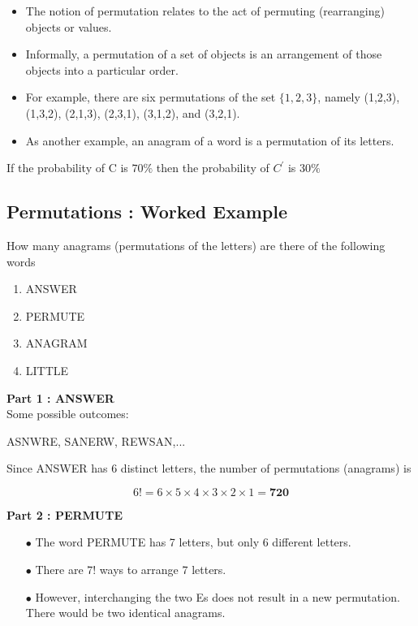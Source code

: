 \documentclass[]{report}
\begin{document}
	\begin{itemize}
		\item The notion of permutation relates to the act of permuting (rearranging) objects or values. 
		\item Informally, a permutation of a set of objects is an arrangement of those objects into a particular order. 
		
		\item For example, there are six permutations of the set $\{1,2,3\}$, namely (1,2,3), (1,3,2), (2,1,3), (2,3,1), (3,1,2), and (3,2,1). 
		\item As another example, an anagram of a word is a permutation of its letters. 
		
	\end{itemize}
	
	If the probability of C is $70 \%$ then the probability of $C^{\prime}$ is $30\%$		
	
	
	\subsection*{Permutations : Worked Example}
	
	How many anagrams (permutations of the letters) are there of the following words
	
	\begin{framed}
		\begin{multicols}{2}
			\begin{enumerate}
				\item ANSWER
				\item PERMUTE
				\item ANAGRAM
				\item LITTLE
			\end{enumerate}
		\end{multicols}
	\end{framed}
	
	
	\textbf{Part 1 : ANSWER}\\
	Some possible outcomes:
	\begin{center}
		ASNWRE,\;
		SANERW,\;
		REWSAN,\;...
	\end{center}
	
	Since ANSWER has 6 distinct letters, the number of permutations (anagrams) is
	
	\[6! = 6\times 5 \times 4 \times 3 \times 2\times 1 = \boldsymbol{720} \]
	
	\textbf{Part 2 : PERMUTE}\\
	\begin{itemize}
		\item[$\bullet$] The word PERMUTE has 7 letters, but only 6 different letters. 
		\item[$\bullet$] There are 7! ways to arrange 7 letters.
		\item[$\bullet$] However, interchanging the two Es does not result in a new permutation. There would be two identical anagrams.
	\end{itemize}
	
\end{document}
